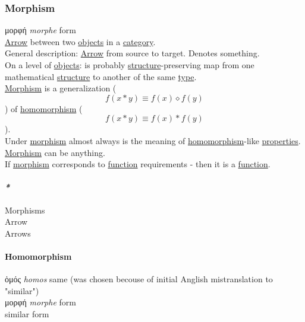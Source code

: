 \documentclass[11pt]{article}
\begin{document}
\subsubsection{\label{org5de09d4}Morphism}
\label{sec:org1288d91}
μορφή \emph{morphe} form\\
\hyperref[org03967f4]{Arrow} between two \hyperref[org363acc2]{objects} in a \hyperref[org0450535]{category}.\\

General description: \hyperref[org03967f4]{Arrow} from source to target. Denotes something.\\

On a level of \hyperref[org363acc2]{objects}: is probably \hyperref[org8051f61]{structure}-preserving map from one mathematical \hyperref[org8051f61]{structure} to another of the same \hyperref[orgc4aea2f]{type}.\\

\hyperref[org5de09d4]{Morphism} is a generalization ($$ f(x*y) \equiv f(x) \diamond f(y) $$) of \hyperref[org4991058]{homomorphism} ($$ f(x*y) \equiv f(x) * f(y) $$).\\
Under \hyperref[org5de09d4]{morphism} almost always is the meaning of \hyperref[org4991058]{homomorphism}-like \hyperref[org85fb3a1]{properties}.\\

\hyperref[org5de09d4]{Morphism} can be anything.\\

If \hyperref[org5de09d4]{morphism} corresponds to \hyperref[orge15bc14]{function} requirements - then it is a \hyperref[orge15bc14]{function}.\\

\paragraph{\emph{*}}
\label{sec:orgd845a9c}

\label{org6c2fa5c}Morphisms\\
\label{org03967f4}Arrow\\
\label{org9c45dc6}Arrows\\

\paragraph{\label{org4991058}Homomorphism}
\label{sec:org78292bb}
ὁμός \emph{homos} same (was chosen becouse of initial Anglish mistranslation to "similar")\\
μορφή \emph{morphe} form\\
similar form\\
\end{document}
